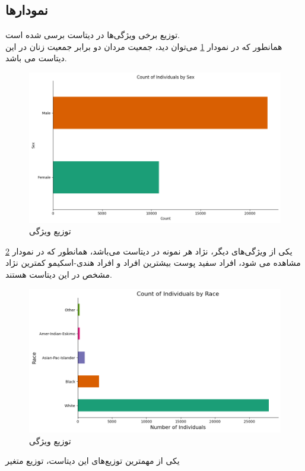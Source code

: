 \documentclass{article}
\begin{document}
	\subsection{نمودار‌ها}
	توزیع برخی ویژگی‌ها در دیتاست برسی شده است.\\
	همانطور که در نمودار 
	\ref{fig: sex dist}
	می‌توان دید، جمعیت مردان دو برابر جمعیت زنان در این دیتاست می باشد.
	\begin{figure}[H]
		\centering
		\includegraphics[scale=0.5]{figs/sex_dist}
		\caption{
			توزیع ویژگی 
		}
		\label{fig: sex dist}
	\end{figure}
			یکی از ویژگی‌های دیگر، نژاد هر نمونه در دیتاست می‌باشد، همانطور که در نمودار
			\ref{fig: race dist}
			 مشاهده می شود، افراد سفید پوست بیشترین افراد و افراد هندی-اسکیمو کمترین نژاد مشخص در این دیتاست هستند.
	\begin{figure}[H]
		\centering
		\includegraphics[scale=0.5]{figs/Race_dist}
		\caption{
			توزیع ویژگی 
		}
		\label{fig: race dist}
	\end{figure}
	یکی از مهمترین توزیع‌های این دیتاست، توزیع متغیر 
\end{document}
